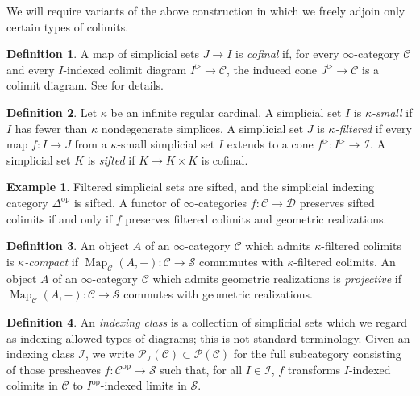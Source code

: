 \documentclass[12pt]{article}
\theoremstyle{definition}
\newtheorem{definition}{Definition}[subsection]
\newtheorem{example}{Example}[subsection]
\newcommand{\C}{\mathcal{C}}
\newcommand{\D}{\mathcal{D}}
\newcommand{\I}{\mathcal{I}}
\renewcommand{\P}{\mathcal{P}}
\renewcommand{\S}{\mathcal{S}}
\renewcommand{\i}{\infty}
\newcommand{\op}{\mathrm{op}}
\DeclareMathOperator{\Map}{Map}
\begin{document}
We will require variants of the above construction in which we freely adjoin only certain types of colimits.

\begin{definition}
A map of simplicial sets $J\to I$ is {\em cofinal} if, for every $\i$-category $\C$ and every $I$-indexed colimit diagram $I^\triangleright\to\C$, the induced cone $J^\triangleright\to\C$ is a colimit diagram. See \cite[Proposition 4.1.1.8]{HTT} for details.
\end{definition}



\begin{definition}
Let $\kappa$ be an infinite regular cardinal.
A simplicial set $I$ is {\em $\kappa$-small} if $I$ has fewer than $\kappa$ nondegenerate simplices.
A simplicial set $J$ is {\em $\kappa$-filtered} if every map $f:I\to J$ from a $\kappa$-small simplicial set $I$ extends to a cone $f^\triangleright:I^\triangleright\to\I$.
A simplicial set $K$ is {\em sifted} if $K\to K\times K$ is cofinal.
\end{definition}

\begin{example}
Filtered simplicial sets are sifted, and the simplicial indexing category $\Delta^{\op}$ is sifted.
A functor of $\i$-categories $f:\C\to\D$ preserves sifted colimits if and only if $f$ preserves filtered colimits and geometric realizations.
\end{example}

 \begin{definition}
 An object $A$ of an $\i$-category $\C$ which admits $\kappa$-filtered colimits is {\em $\kappa$-compact} if $\Map_\C(A,-):\C\to\S$ commmutes with $\kappa$-filtered colimits.
An object $A$ of an $\i$-category $\C$ which admits geometric realizations is {\em projective} if $\Map_\C(A,-):\C\to\S$ commutes with geometric realizations.
 \end{definition}

\begin{definition}
An {\em indexing class} is a collection of simplicial sets which we regard as indexing allowed types of diagrams; this is not standard terminology.
Given an indexing class $\I$, we write $\P_\I(\C)\subset\P(\C)$ for the full subcategory consisting of those presheaves $f:\C^{\op}\to\S$ such that, for all $I\in\I$, $f$ transforms $I$-indexed colimits in $\C$ to $I^{\op}$-indexed limits in $\S$.
\end{definition}
\end{document}
